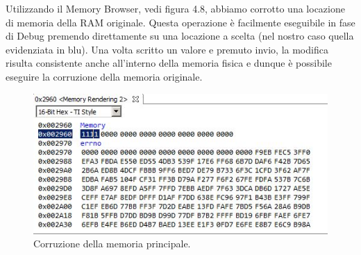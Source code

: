 \documentclass[LaM,binding=0.6cm]{../sapthesis}
\begin{document}
Utilizzando il Memory Browser, vedi figura 4.8, abbiamo corrotto una locazione di memoria della RAM originale. Questa operazione è facilmente eseguibile in fase di Debug premendo direttamente su una locazione a scelta (nel nostro caso quella evidenziata in blu). Una volta scritto un valore e premuto invio, la modifica risulta consistente anche all'interno della memoria fisica e dunque è possibile eseguire la corruzione della memoria originale.

\begin{figure}[htbp]
\centerline{\includegraphics[scale=0.8]{examples/3_MemoryBrowserCorruzione.JPG}}
\caption{Corruzione della memoria principale.}
\label{fig}
\end{figure}
\vspace{0.5cm}
\end{document}
